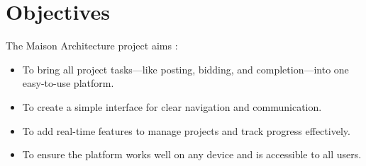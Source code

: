 \section{Objectives}
The Maison Architecture project aims :
\begin{itemize}
    \item To bring all project tasks—like posting, bidding, and completion—into one easy-to-use platform.
    \item  To create a simple interface for clear navigation and communication.
    \item  To add real-time features to manage projects and track progress effectively.
    \item  To ensure the platform works well on any device and is accessible to all users.
\end{itemize}
